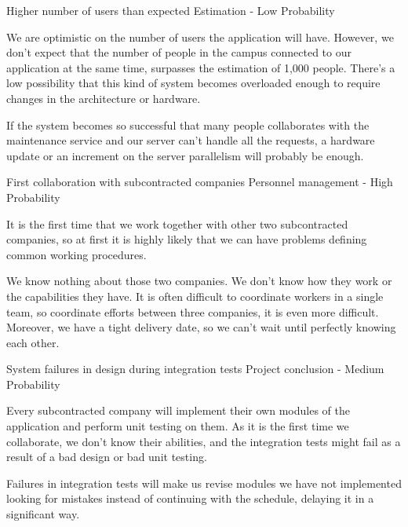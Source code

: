 \begin{risk}{Higher number of users than expected}
\riskcat Estimation
 - Low Probability 

We are optimistic on the number of users the application will have. However, we don't expect that the number of people in the campus connected to our application at the same time, surpasses the estimation of 1,000 people. There's a low possibility that this kind of system becomes overloaded enough to require changes in the architecture or hardware.

If the system becomes so successful that many people collaborates with the maintenance service and our server can't handle all the requests, a hardware update or an increment on the server parallelism will probably be enough.
\end{risk}

\begin{risk}{First collaboration with subcontracted companies}
\riskcat Personnel management
 - High Probability 

It is the first time that we work together with other two subcontracted companies, so at first it is highly likely that we can have problems defining common working procedures.

We know nothing about those two companies. We don't know how they work or the capabilities they have. It is often difficult to coordinate workers in a single team, so coordinate efforts between three companies, it is even more difficult. Moreover, we have a tight delivery date, so we can't wait until perfectly knowing each other.
\end{risk}

\begin{risk}{System failures in design during integration tests}
\riskcat Project conclusion
 - Medium Probability 

Every subcontracted company will implement their own modules of the application and perform unit testing on them. As it is the first time we collaborate, we don't know their abilities, and the integration tests might fail as a result of a bad design or bad unit testing.

Failures in integration tests will make us revise modules we have not implemented looking for mistakes instead of continuing with the schedule, delaying it in a significant way.
\end{risk}

